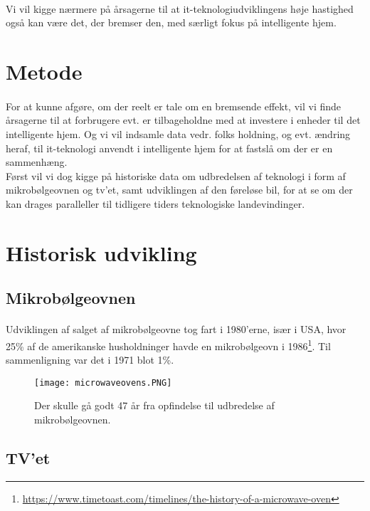 \documentclass{article}
\begin{document}
\paragraph{}
Vi vil kigge nærmere på årsagerne til at it-teknologiudviklingens høje hastighed også kan være det, der bremser den, med særligt fokus på intelligente hjem.
\section{Metode}
\paragraph{}
For at kunne afgøre, om der reelt er tale om en bremsende effekt, vil vi finde årsagerne til at forbrugere evt. er tilbageholdne med at investere i enheder til det intelligente hjem.
Og vi vil indsamle data vedr. folks holdning, og evt. ændring heraf, til it-teknologi anvendt i intelligente hjem for at fastslå om der er en sammenhæng.\\
Først vil vi dog kigge på historiske data om udbredelsen af teknologi i form af mikrobølgeovnen og tv'et, samt udviklingen af den føreløse bil, for at se om der kan drages paralleller til tidligere tiders teknologiske landevindinger.
\section{Historisk udvikling}
\subsection{Mikrobølgeovnen}
\paragraph{}
Udviklingen af salget af mikrobølgeovne tog fart i 1980'erne, især i USA, hvor 25\% af de amerikanske husholdninger havde en mikrobølgeovn i 1986\footnote{\url{https://www.timetoast.com/timelines/the-history-of-a-microwave-oven}}.
Til sammenligning var det i 1971 blot 1\%.
\begin{figure}[htb]
    \centering
    \texttt{[image: microwaveovens.PNG]}
    \caption{Der skulle gå godt 47 år fra opfindelse til udbredelse af mikrobølgeovnen.}
    \label{fig:microwaveovens}
\end{figure}
\subsection{TV'et}
\end{document}
